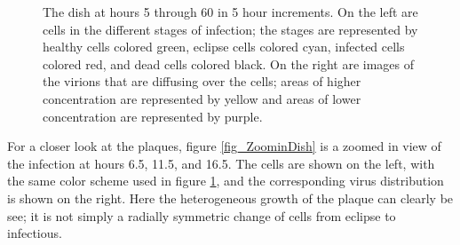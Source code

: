 \begin{figure}
\begin{minipage}{0.8\linewidth}
\begin{multicols}{2}
\end{multicols}
\end{minipage}
\caption{The dish at hours 5 through 60 in 5 hour increments. On the left are cells in the different stages of infection; the stages are represented by healthy cells colored green, eclipse cells colored cyan, infected cells colored red, and dead cells colored black. On the right are images of the virions that are diffusing over the cells; areas of higher concentration are represented by yellow and areas of lower concentration are represented by purple. \label{fig_FullDish_cellandvirus}}
\end{figure}

For a closer look at the plaques, figure \ref{fig_ZoominDish} is a zoomed in view of the infection at hours 6.5, 11.5, and 16.5. The cells are shown on the left, with the same color scheme used in figure \ref{fig_FullDish_cellandvirus}, and the corresponding virus distribution is shown on the right. Here the heterogeneous growth of the plaque can clearly be see; it is not simply a radially symmetric change of cells from eclipse to infectious. 

